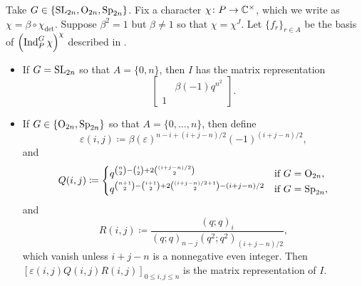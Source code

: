 \begin{proposition} \label{prop:quadratic-matrix}
    Take $G\in\{\mathrm{SL}_{2n},\mathrm{O}_{2n},\mathrm{Sp}_{2n}\}$. Fix a character $\chi\colon P\to\mathbb C^\times$, which we write as $\chi=\beta\circ\chi_{\det}$.
    Suppose $\beta^2=1$ but $\beta\ne1$ so that $\chi=\chi^J$. Let $\{f_r\}_{r\in A}$
    be the basis of $\left(\operatorname{Ind}_P^G\chi\right)^\chi$ described in .
    \begin{itemize}
        \item If $G=\mathrm{SL}_{2n}$ so that $A=\{0,n\}$, then $I$ has the matrix representation
        \[\begin{bmatrix}
            & \beta(-1)q^{n^2} \\ 1
        \end{bmatrix}.\]
        \item If $G\in\{\mathrm{O}_{2n},\mathrm{Sp}_{2n}\}$ so that $A=\{0,\ldots,n\}$, then define
        \[\varepsilon(i,j)\coloneqq\beta(\varepsilon)^{n-i+(i+j-n)/2}(-1)^{(i+j-n)/2},
        \]
        and
        \[Q(i,j)\coloneqq\begin{cases}
            q^{\binom{n}2-\binom{i}2+2\binom{(i+j-n)/2}2} & \text{if }G=\mathrm{O}_{2n}, \\
            q^{\binom{n+1}2-\binom{i+1}2+2\binom{(i+j-n)/2+1}2-(i+j-n)/2} & \text{if }G=\mathrm{Sp}_{2n},
        \end{cases}\]
        and
        \[R(i,j)\coloneqq\frac{(q;q)_i}{(q;q)_{n-j}(q^2;q^2)_{(i+j-n)/2}},
        \]
        which vanish unless $i+j-n$ is a nonnegative even integer. Then $[\varepsilon(i,j)Q(i,j)R(i,j)]_{0\le i,j\le n}$ is the matrix representation of $I$.
    \end{itemize}
\end{proposition}
